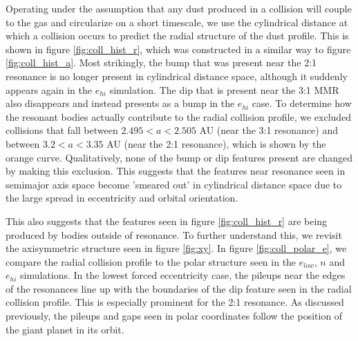 \documentclass[onecolumn]{aastex63}
\begin{document}
Operating under the assumption that any dust produced in a collision will couple to the gas and circularize on a short timescale, we use the cylindrical distance at which a collision occurs to predict the radial structure of the dust profile. This is shown in figure \ref{fig:coll_hist_r}, which was constructed in a similar way to figure \ref{fig:coll_hist_a}. Most strikingly, the bump that was present near the 2:1 resonance is no longer present in cylindrical distance space, although it suddenly appears again in the $e_{hi}$ simulation. The dip that is present near the 3:1 MMR also disappears and instead presents as a bump in the $e_{hi}$ case. To determine how the resonant bodies actually contribute to the radial collision profile, we excluded collisions that fall between $2.495 < a < 2.505$ AU (near the 3:1 resonance) and between $3.2 < a < 3.35$ AU (near the 2:1 resonance), which is shown by the orange curve. Qualitatively, none of the bump or dip features present are changed by making this exclusion. This suggests that the features near resonance seen in semimajor axis space become 'smeared out' in cylindrical distance space due to the large spread in eccentricity and orbital orientation.

This also suggests that the features seen in figure \ref{fig:coll_hist_r} are being produced by bodies outside of resonance. To further understand this, we revisit the axisymmetric structure seen in figure \ref{fig:xy}. In figure \ref{fig:coll_polar_e}, we compare the radial collision profile to the polar structure seen in the $e_{low}$, $n$ and $e_{hi}$ simulations. In the lowest forced eccentricity case, the pileups near the edges of the resonances line up with the boundaries of the dip feature seen in the radial collision profile. This is especially prominent for the 2:1 resonance. As discussed previously, the pileups and gaps seen in polar coordinates follow the position of the giant planet in its orbit.
\end{document}

